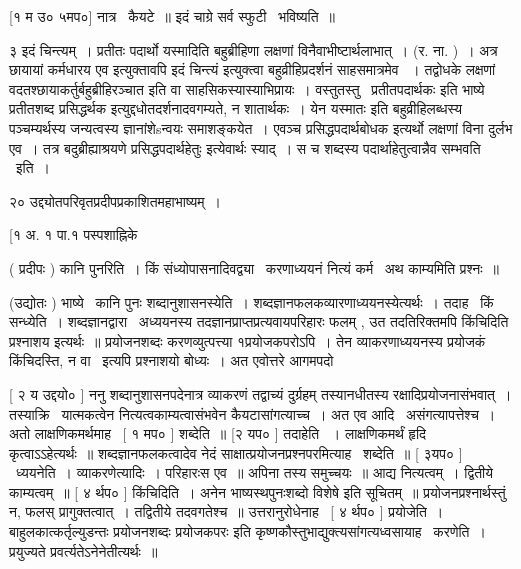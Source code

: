 \documentclass[11pt, openany]{book}
\begin{document}
 [१ म उ० ५मप०] नात्र \textendash\ कैयटे~॥ इदं चाग्रे सर्व स्फुटी \textendash\ भविष्यति~॥




३ इदं चिन्त्यम्~। प्रतीतः पदार्थो यस्मादिति बहुब्रीहिणा लक्षणां
विनैवाभीष्टार्थलाभात्~। (र. ना. )~। अत्र छायायां {\qt कर्मधारय एव}
इत्युक्तावपि {\qt इदं चिन्त्यं} इत्युक्त्वा बहुव्रीहिप्रदर्शनं साहसमात्रमेव
~। तद्वोधके लक्षणां वदतश्छायाकर्तुर्बहुब्रीहिरञ्चात इति वा
साहसिकस्यास्याभिप्रायः~। वस्तुतस्तु \textendash\ {\qt प्रतीतपदार्थकः} इति भाष्ये
प्रतीतशब्द प्रसिद्धर्थक इत्युद्दधोतदर्शनादवगम्यते, न शातार्थकः~। येन
{\qt यस्मातः इति बहुव्रीहिलब्धस्य} पञ्चम्यर्थस्य जन्यत्वस्य ज्ञानांशेsन्वयः
समाशङ्कयेत~। एवञ्च प्रसिद्धपदार्थबोधक इत्यर्थो लक्षणां विना दुर्लभ एव~। 
तत्र बदुब्रीह्याश्रयणे {\qt प्रसिद्धपदार्थहेतुः} इत्येवार्थः स्याद्~। स च
शब्दस्य पदार्थाहेतुत्वान्नैव सम्भवति \textendash\ इति~। 

२० उद्द्योतपरिवृतप्रदीपप्रकाशितमहाभाष्यम्~। 

 [१ अ. १ पा.१ पस्पशाह्निके



 ( प्रदीपः ) कानि पुनरिति~। किं संध्योपासनादिवद्व्या \textendash\ करणाध्ययनं
नित्यं कर्म \textendash\ अथ काम्यमिति प्रश्नः~॥ 

 (उद्योतः ) भाष्ये \textendash\ कानि पुनः शब्दानुशासनस्येति~। 
शब्दज्ञानफलकव्यारणाध्ययनस्येत्यर्थः~। तदाह \textendash\ किं सन्ध्येति~। 
शब्दज्ञानद्वारा \textendash\ अध्ययनस्य तदज्ञानप्राप्तप्रत्यवायपरिहारः फलम् , उत
तदतिरिक्तमपि किंचिदिति प्रश्नाशय इत्यर्थः~॥ प्रयोजनशब्दः
करणव्युत्पत्त्या १प्रयोजकपरोऽपि~। तेन व्याकरणाध्ययनस्य प्रयोजकं
किंचिदस्ति, न वा \textendash\ इत्यपि प्रश्नाशयो बोध्यः~। अत एवोत्तरे आगमपदो



 [ २ य उद्दयो० ] ननु शब्दानुशासनपदेनात्र व्याकरणं तद्वाच्यं
दुर्ग्रहम् तस्यानधीतस्य रक्षादिप्रयोजनासंभवात्~। तस्याक्रि \textendash\ यात्मकत्वेन
नित्यत्वकाम्यत्वासंभवेन कैयटासांगत्याच्च~। अत एव आदि \textendash\ असंगत्यापत्तेश्च~। 
अतो लाक्षणिकमर्थमाह \textendash\ [ १ मप० ] शब्देति~॥ [२ यप० ] तदाहेति
~। लाक्षणिकमर्थं हृदि कृत्वाऽऽहेत्यर्थः~॥ शब्दज्ञानफलकत्वादेव नेदं
साक्षात्प्रयोजनप्रश्नपरमित्याह \textendash\ शब्देति~॥ [ ३यप० ] \textendash\ ध्ययनेति~। 
व्याकरणेत्यादिः~। परिहारःस एव~॥ अपिना तस्य समुच्चयः~॥ आद्य
नित्यत्वम्~। द्वितीये काम्यत्वम्~॥ [ ४ र्थप० ] किंचिदिति~। अनेन
{\qt भाष्यस्थपुनःशब्दो विशेषे} इति सूचितम्~॥ प्रयोजनप्रश्नार्थस्तुं न, फलस्
प्रागुक्तत्वात्~। तद्वितीये तदवगतेश्च~॥ उत्तरानुरोधेनाह \textendash\ [ ४ र्थप० ]
प्रयोजेति~। {\qt बाहुलकात्कर्तृल्युडन्तः} प्रयोजनशब्दः प्रयोजकपरः इति
कृष्णकौस्तुभाद्युक्त्यसांगत्यध्वसायाह \textendash\ करणेति~। प्रयुज्यते
प्रवर्त्यतेऽनेनेतीत्यर्थः~॥ 
\end{document}
